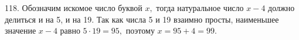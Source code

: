 118. Обозначим искомое число буквой $x,$ тогда натуральное число $x-4$ должно делиться и на 5, и на 19. Так как числа 5 и 19 взаимно просты, наименьшее значение $x-4$ равно $5\cdot19=95,$ поэтому $x=95+4=99.$\\
